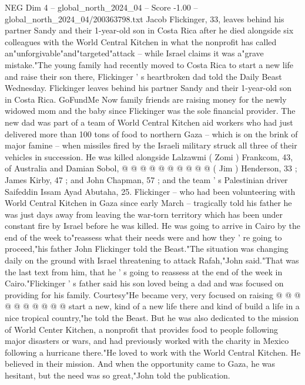 \begin{textsample}{NEG Dim 4 – global\_north\_2024\_04 – Score -1.00 – global\_north\_2024\_04/200363798.txt}  \label{ex:f4_neg_092}
Jacob Flickinger, 33, leaves behind his partner Sandy and their 1-year-old son in Costa Rica after he died alongside six colleagues with the World Central Kitchen in what the nonprofit has called an"unforgivable"and"targeted"attack -- while Israel claims it was a"grave mistake."The young family had recently moved to Costa Rica to start a new life and raise their son there, Flickinger ' s heartbroken dad told the Daily Beast Wednesday.
Flickinger leaves behind his partner Sandy and their 1-year-old son in Costa Rica.
GoFundMe Now family friends are raising money for the newly widowed mom and the baby since Flickinger was the sole financial provider.
The new dad was part of a team of World Central Kitchen aid workers who had just delivered more than 100 tons of food to northern Gaza -- which is on the brink of major famine -- when missiles fired by the Israeli military struck all three of their vehicles in succession.
He was killed alongside Lalzawmi ( Zomi ) Frankcom, 43, of Australia and Damian Sobol, @ @ @ @ @ @ @ @ @ @ ( Jim ) Henderson, 33 ; James Kirby, 47 ; and John Chapman, 57 ; and the team ' s Palestinian driver Saifeddin Issam Ayad Abutaha, 25.
Flickinger -- who had been volunteering with World Central Kitchen in Gaza since early March -- tragically told his father he was just days away from leaving the war-torn territory which has been under constant fire by Israel before he was killed.
He was going to arrive in Cairo by the end of the week to"reassess what their needs were and how they ' re going to proceed,"his father John Flickinger told the Beast."The situation was changing daily on the ground with Israel threatening to attack Rafah,"John said."That was the last text from him, that he ' s going to reassess at the end of the week in Cairo."Flickinger ' s father said his son loved being a dad and was focused on providing for his family.
Courtesy"He became very, very focused on raising @ @ @ @ @ @ @ @ @ @ start a new, kind of a new life there and kind of build a life in a nice tropical country,"he told the Beast.
But he was also dedicated to the mission of World Center Kitchen, a nonprofit that provides food to people following major disasters or wars, and had previously worked with the charity in Mexico following a hurricane there."He loved to work with the World Central Kitchen.
He believed in their mission.
And when the opportunity came to Gaza, he was hesitant, but the need was so great,"John told the publication.

\end{textsample}

